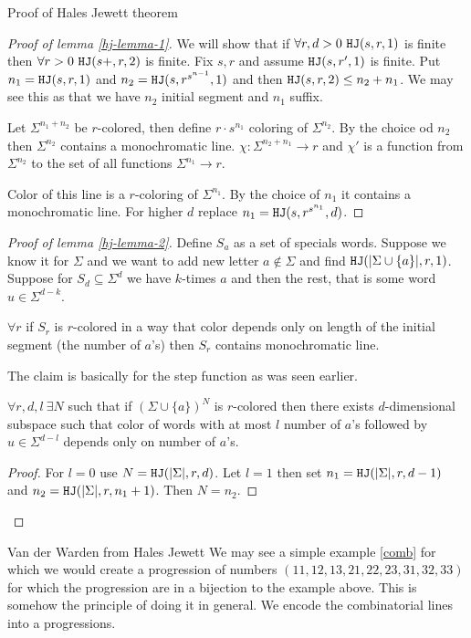\begin{topic}{Proof of Hales Jewett theorem}
	\begin{proof}[Proof of lemma \ref{hj-lemma-1}]
		We will show that if $\forall r, d > 0 \ \mathtt{HJ}(s,r,1)$ is finite then $\forall r > 0 \ \mathtt{HJ}(s+, r, 2)$ is finite. Fix $s, r$ and assume $\mathtt{HJ}(s, r', 1)$ is finite. Put $n_1 = \mathtt{HJ}(s,r,1)$ and $n_2 = \mathtt{HJ}(s, r^{s^{n-1}}, 1)$ and then $\mathtt{HJ}(s,r,2) \leq n_2 + n_1$. We may see this as that we have $n_2$ initial segment and $n_1$ suffix.
		
		Let $\Sigma^{n_1 + n_2}$ be $r$-colored, then define $r \cdot s^{n_1}$ coloring of $\Sigma^{n_2}$. By the choice od $n_2$ then $\Sigma^{n_2}$ contains a monochromatic line. $\chi : \Sigma^{n_2 + n_1} \to r$ and $\chi'$ is a function from $\Sigma^{n_2}$ to the set of all functions $\Sigma^{n_1} \to r$.
		
		Color of this line is a $r$-coloring of $\Sigma^{n_1}$. By the choice of $n_1$ it contains a monochromatic line. For higher $d$ replace $n_1 = \mathtt{HJ}(s, r^{s^{n_1}}, d)$.
	\end{proof}

	\begin{proof}[Proof of lemma \ref{hj-lemma-2}]
		Define $S_a$ as a set of specials words. Suppose we know it for $\Sigma$ and we want to add new letter $a \notin \Sigma$ and find $\mathtt{HJ}(|\Sigma \cup \{a\}|, r, 1)$. Suppose for $S_d \subseteq \Sigma^d$ we have $k$-times $a$ and then the rest, that is some word $u \in \Sigma^{d-k}$.
		
		\begin{claim}
			$\forall r$ if $S_r$ is $r$-colored in a way that color depends only on length of the initial segment (the number of $a$'s) then $S_r$ contains monochromatic line.
		\end{claim}
	
		The claim is basically for the step function as was seen earlier.
		
		\begin{claim}
			$\forall r, d, l \ \exists N$ such that if $(\Sigma \cup \{a\})^N$ is $r$-colored then there exists $d$-dimensional subspace such that color of words with at most $l$ number of $a$'s followed by $u \in \Sigma^{d-l}$ depends only on number of $a$'s.
		\end{claim}
	
		\begin{proof}
			For $l = 0$ use $N = \mathtt{HJ}(|\Sigma|, r, d)$. Let $l = 1$ then set $n_1 = \mathtt{HJ}(|\Sigma|, r, d-1)$ and $n_2 = \mathtt{HJ}(|\Sigma|, r, n_1 + 1)$. Then $N = n_2$.
		\end{proof}
	\end{proof}
\end{topic}

\begin{topic}{Van der Warden from Hales Jewett}
	We may see a simple example \ref{comb} for which we would create a progression of numbers $(11, 12, 13, 21, 22, 23, 31, 32, 33)$ for which the progression are in a bijection to the example above. This is somehow the principle of doing it in general. We encode the combinatorial lines into a progressions.
\end{topic}